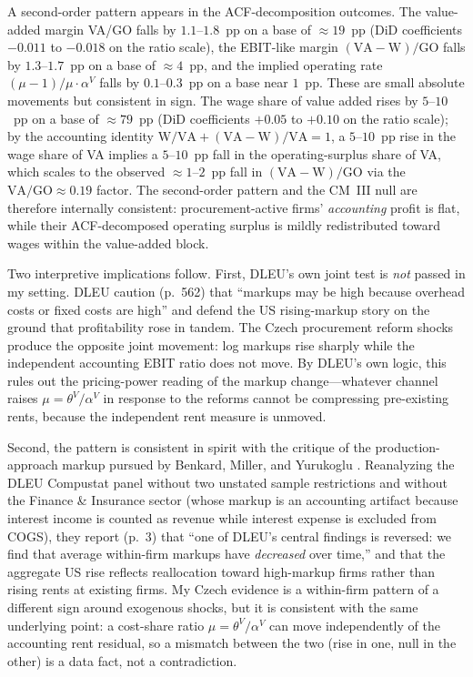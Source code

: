 \documentclass[11pt]{article}
\begin{document}
A second-order pattern appears in the ACF-decomposition outcomes. The value-added margin VA/GO falls by $1.1$--$1.8$~pp on a base of $\approx 19$~pp (DiD coefficients $-0.011$ to $-0.018$ on the ratio scale), the EBIT-like margin $(\text{VA}{-}\text{W})/\text{GO}$ falls by $1.3$--$1.7$~pp on a base of $\approx 4$~pp, and the implied operating rate $(\mu{-}1)/\mu\cdot\alpha^V$ falls by $0.1$--$0.3$~pp on a base near $1$~pp. These are small absolute movements but consistent in sign. The wage share of value added rises by $5$--$10$~pp on a base of $\approx 79$~pp (DiD coefficients $+0.05$ to $+0.10$ on the ratio scale); by the accounting identity $\text{W}/\text{VA} + (\text{VA}{-}\text{W})/\text{VA} = 1$, a $5$--$10$~pp rise in the wage share of VA implies a $5$--$10$~pp fall in the operating-surplus share of VA, which scales to the observed $\approx 1$--$2$~pp fall in $(\text{VA}{-}\text{W})/\text{GO}$ via the $\text{VA}/\text{GO}\approx 0.19$ factor. The second-order pattern and the CM~III null are therefore internally consistent: procurement-active firms' \emph{accounting} profit is flat, while their ACF-decomposed operating surplus is mildly redistributed toward wages within the value-added block.

Two interpretive implications follow. First, DLEU's \cite{DLEU2020} own joint test is \emph{not} passed in my setting. DLEU caution (p.~562) that ``markups may be high because overhead costs or fixed costs are high'' and defend the US rising-markup story on the ground that profitability rose in tandem. The Czech procurement reform shocks produce the opposite joint movement: log markups rise sharply while the independent accounting EBIT ratio does not move. By DLEU's own logic, this rules out the pricing-power reading of the markup change---whatever channel raises $\mu = \theta^V/\alpha^V$ in response to the reforms cannot be compressing pre-existing rents, because the independent rent measure is unmoved.

Second, the pattern is consistent in spirit with the critique of the production-approach markup pursued by Benkard, Miller, and Yurukoglu \cite{BMY2026}. Reanalyzing the DLEU Compustat panel without two unstated sample restrictions and without the Finance \& Insurance sector (whose markup is an accounting artifact because interest income is counted as revenue while interest expense is excluded from COGS), they report (p.~3) that ``one of DLEU's central findings is reversed: we find that average within-firm markups have \emph{decreased} over time,'' and that the aggregate US rise reflects reallocation toward high-markup firms rather than rising rents at existing firms. My Czech evidence is a within-firm pattern of a different sign around exogenous shocks, but it is consistent with the same underlying point: a cost-share ratio $\mu = \theta^V/\alpha^V$ can move independently of the accounting rent residual, so a mismatch between the two (rise in one, null in the other) is a data fact, not a contradiction.
\end{document}
